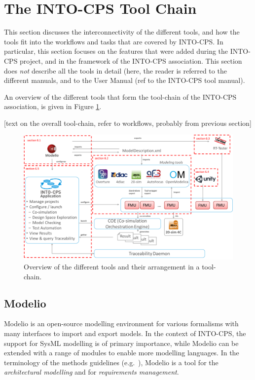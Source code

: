 
\section{The INTO-CPS Tool Chain}\label{sec:toolchain}




This section discusses the interconnectivity of the different tools, and how the tools fit into the workflows and tasks that are covered by INTO-CPS. In particular, this section focuses on the features that were added during the INTO-CPS project, and in the framework of the INTO-CPS association. This section does \textit{not} describe all the tools in detail (here, the reader is referred to the different manuals, and to the User Manual (ref to the INTO-CPS tool manual).

An overview of the different tools that form the tool-chain of the INTO-CPS association, is given in Figure \ref{fig:tool-chain}.

[text on the overall tool-chain, refer to workflows, probably from previous section]

\begin{figure}[!ht]
	\centering
		\includegraphics[width=0.9 \textwidth]{./figures/toolchain_association}
	\caption{Overview of the different tools and their arrangement in a tool-chain.}
	\label{fig:tool-chain}
\end{figure}

\subsection{Modelio}
\label{sec:modelio}
Modelio is an open-source modelling environment for various formalisms with many interfaces to import and export models. In the context of INTO-CPS, the support for SysML modelling is of primary importance, while Modelio can be extended with a range of modules to enable more modelling languages. In the terminology of the methods guidelines (e.g.\ \cite{INTOCPSD3.3a}), Modelio is a tool for the \textit{architectural modelling} and for \textit{requirements management}.

